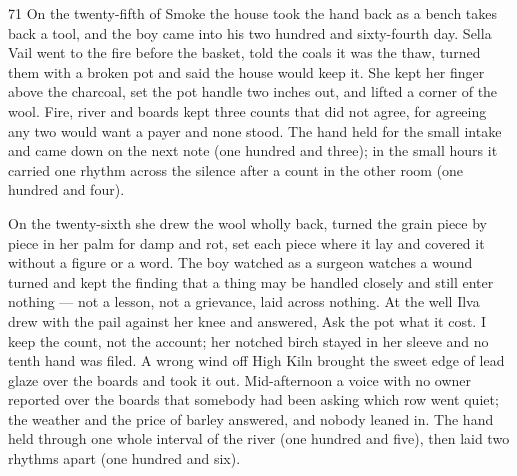 
\scenebreak


\scenebreak


\scenebreak

\CRtailpiece
\begin{CRchronicle}{71}
On the twenty-fifth of Smoke the house took the hand back as a bench takes back a tool, and the boy came into his two hundred and sixty-fourth day. Sella Vail went to the fire before the basket, told the coals it was the thaw, turned them with a broken pot and said the house would keep it. She kept her finger above the charcoal, set the pot handle two inches out, and lifted a corner of the wool. Fire, river and boards kept three counts that did not agree, for agreeing any two would want a payer and none stood. The hand held for the small intake and came down on the next note (one hundred and three); in the small hours it carried one rhythm across the silence after a count in the other room (one hundred and four).

On the twenty-sixth she drew the wool wholly back, turned the grain piece by piece in her palm for damp and rot, set each piece where it lay and covered it without a figure or a word. The boy watched as a surgeon watches a wound turned and kept the finding that a thing may be handled closely and still enter nothing --- not a lesson, not a grievance, laid across nothing. At the well Ilva drew with the pail against her knee and answered, Ask the pot what it cost. I keep the count, not the account; her notched birch stayed in her sleeve and no tenth hand was filed. A wrong wind off High Kiln brought the sweet edge of lead glaze over the boards and took it out. Mid-afternoon a voice with no owner reported over the boards that somebody had been asking which row went quiet; the weather and the price of barley answered, and nobody leaned in. The hand held through one whole interval of the river (one hundred and five), then laid two rhythms apart (one hundred and six).


\end{CRchronicle}
